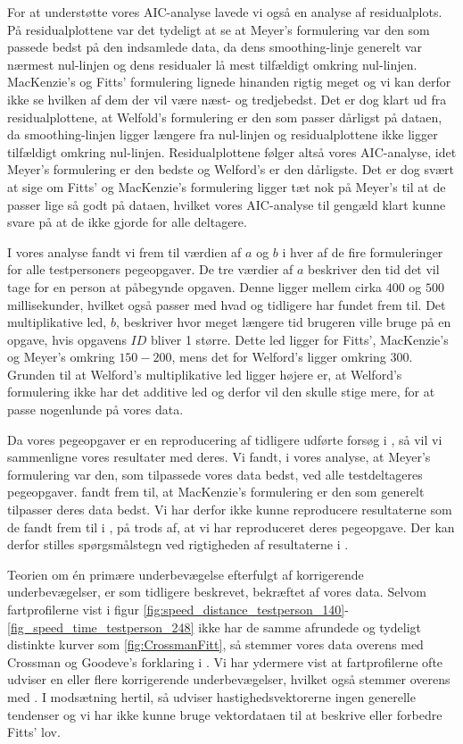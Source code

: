 For at understøtte vores AIC-analyse lavede vi også en analyse af residualplots. På residualplottene var det tydeligt at se at Meyer's formulering var den som passede bedst på den indsamlede data, da dens smoothing-linje generelt var nærmest nul-linjen og dens residualer lå mest tilfældigt omkring nul-linjen. MacKenzie's og Fitts' formulering lignede hinanden rigtig meget og vi kan derfor ikke se hvilken af dem der vil være næst- og tredjebedst. Det er dog klart ud fra residualplottene, at Welfold's formulering er den som passer dårligst på dataen, da smoothing-linjen ligger længere fra nul-linjen og residualplottene ikke ligger tilfældigt omkring nul-linjen. Residualplottene følger altså vores AIC-analyse, idet Meyer's formulering er den bedste og Welford's er den dårligste. Det er dog svært at sige om Fitts' og MacKenzie's formulering ligger tæt nok på Meyer's til at de passer lige så godt på dataen, hvilket vores AIC-analyse til gengæld klart kunne svare på at de ikke gjorde for alle deltagere.

I vores analyse fandt vi frem til værdien af $a$ og $b$ i hver af de fire formuleringer for alle testpersoners pegeopgaver. De tre værdier af $a$ beskriver den tid det vil tage for en person at påbegynde opgaven. Denne ligger mellem cirka $400$ og $500$ millisekunder, hvilket også passer med hvad \cite{crossman1957} og \cite{welford1968} tidligere har fundet frem til. Det multiplikative led, $b$, beskriver hvor meget længere tid brugeren ville bruge på en opgave, hvis opgavens $ID$ bliver 1 større. Dette led ligger for Fitts', MacKenzie's og Meyer's omkring $150-200$, mens det for Welford's ligger omkring $300$. Grunden til at Welford's multiplikative led ligger højere er, at Welford's formulering ikke har det additive led og derfor vil den skulle stige mere, for at passe nogenlunde på vores data.

Da vores pegeopgaver er en reproducering af tidligere udførte forsøg i \cite{goldberg2015}, så vil vi sammenligne vores resultater med deres. Vi fandt, i vores analyse, at Meyer's formulering var den, som tilpassede vores data bedst, ved alle testdeltageres pegeopgaver. \cite{goldberg2015} fandt frem til, at MacKenzie's formulering er den som generelt tilpasser deres data bedst. Vi har derfor ikke kunne reproducere resultaterne som de fandt frem til i \cite{goldberg2015}, på trods af, at vi har reproduceret deres pegeopgave. Der kan derfor stilles spørgsmålstegn ved rigtigheden af resultaterne i \cite{goldberg2015}.

Teorien om én primære underbevægelse efterfulgt af korrigerende underbevægelser, er som tidligere beskrevet, bekræftet af vores data. Selvom fartprofilerne vist i figur \ref{fig:speed_distance_testperson_140}-\ref{fig_speed_time_testperson_248} ikke har de samme afrundede og tydeligt distinkte kurver som \ref{fig:CrossmanFitt}, så stemmer vores data overens med Crossman og Goodeve's forklaring i \cite{crossman1983}. Vi har ydermere vist at fartprofilerne ofte udviser en eller flere korrigerende underbevægelser, hvilket også stemmer overens med \cite{crossman1983}. I modsætning hertil, så udviser hastighedsvektorerne ingen generelle tendenser og vi har ikke kunne bruge vektordataen til at beskrive eller forbedre Fitts' lov.

